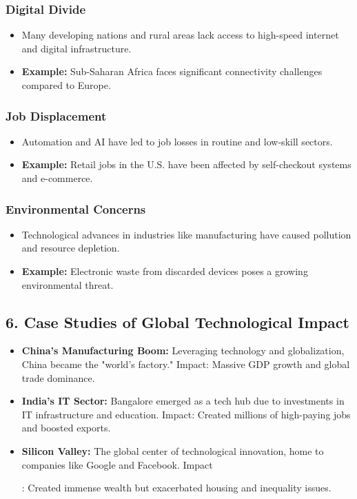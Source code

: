 \documentclass{article}
\begin{document}
\subsubsection*{ Digital Divide}
\begin{itemize}
    \item Many developing nations and rural areas lack access to high-speed internet and digital infrastructure.
    \item \textbf{Example:} Sub-Saharan Africa faces significant connectivity challenges compared to Europe.
\end{itemize}

\subsubsection*{ Job Displacement}
\begin{itemize}
    \item Automation and AI have led to job losses in routine and low-skill sectors.
    \item \textbf{Example:} Retail jobs in the U.S. have been affected by self-checkout systems and e-commerce.
\end{itemize}

\subsubsection*{ Environmental Concerns}
\begin{itemize}
    \item Technological advances in industries like manufacturing have caused pollution and resource depletion.
    \item \textbf{Example:} Electronic waste from discarded devices poses a growing environmental threat.
\end{itemize}

\subsection*{6. Case Studies of Global Technological Impact}

\begin{itemize}
    \item \textbf{China’s Manufacturing Boom:} Leveraging technology and globalization, China became the "world's factory." Impact: Massive GDP growth and global trade dominance.
    \item \textbf{India’s IT Sector:} Bangalore emerged as a tech hub due to investments in IT infrastructure and education. Impact: Created millions of high-paying jobs and boosted exports.
    \item \textbf{Silicon Valley:} The global center of technological innovation, home to companies like Google and Facebook. Impact

: Created immense wealth but exacerbated housing and inequality issues.
\end{itemize}
\end{document}
